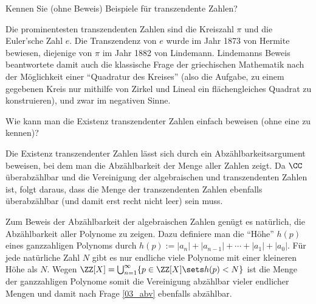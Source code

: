 \begin{frage}\label{03_trz}
  Kennen Sie (ohne Beweis) Beispiele für transzendente Zahlen?
\end{frage}

\begin{antwort}
  Die prominentesten transzendenten Zahlen sind die Kreiszahl 
  $\pi$ und die Euler'sche Zahl $e$. Die Transzendenz von $e$ wurde 
  im Jahr 1873 von Hermite 
  bewiesen, diejenige von $\pi$ im Jahr 
  1882 von Lindemann. 
  Lindemanns Beweis beantwortete damit auch 
  die klassische Frage der griechischen Mathematik nach der 
  Möglichkeit einer 
  "`Quadratur des Kreises"' 
  (also die Aufgabe, zu einem gegebenen Kreis 
  nur mithilfe von Zirkel und Lineal ein 
  flächengleiches Quadrat zu konstruieren), und zwar im negativen Sinne. 
  \AntEnd
\end{antwort}

\begin{frage}\label{03_trex}
  Wie kann man die Existenz transzendenter Zahlen einfach beweisen 
  (ohne eine zu kennen)?
\end{frage}

\begin{antwort}
  Die Existenz transzendenter Zahlen lässt sich durch ein 
  Abzählbarkeitsargument beweisen, bei dem man die Abzählbarkeit 
  der Menge aller  Zahlen zeigt. 
  Da $\CC$ überabzählbar und die Vereinigung der algebraischen und 
  transzendenten Zahlen ist, folgt daraus, dass die Menge der transzendenten 
  Zahlen ebenfalls überabzählbar (und damit erst recht nicht leer) sein muss. 

  Zum Beweis der Abzählbarkeit der algebraischen Zahlen
  genügt es natürlich, die Abzählbarkeit aller  Polynome
  zu zeigen.  
  Dazu definiere man die "`Höhe"' $h( p )$ 
  eines ganzzahligen Polynoms durch $
  h( p ) := |a_n| + |a_{n-1}| + \cdots + |a_1| + |a_0|$. 
  Für jede natürliche Zahl $N$ gibt es nur endliche viele Polynome 
  mit einer kleineren Höhe als $N$. Wegen $
  \ZZ [X]   = \bigcup_{n=1}^\infty \{ p\in \ZZ[X]\sets h(p) < N \}$
  ist die Menge der ganzzahligen Polynome somit die Vereinigung 
  abzählbar vieler endlicher Mengen und damit nach Frage 
  \ref{03_abv} ebenfalls abzählbar. 
  \AntEnd
\end{antwort}

